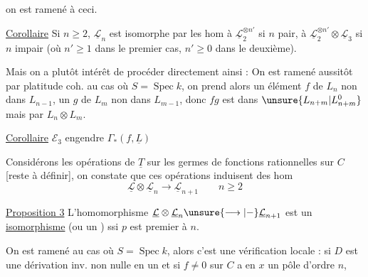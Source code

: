 
on est ramené à ceci.

\uline{Corollaire} Si $n\geq2$, $\underline{\mathcal L}_n$ est isomorphe par les hom  à $\underline{\mathcal L}_2^{\otimes n'}$ si $n$ pair, à $\underline{\mathcal L}_2^{\otimes n'}\otimes\underline{\mathcal L}_3$ si $n$ impair (où $n'\geq1$ dans le premier cas, $n'\geq0$ dans le deuxième).

Mais on a plutôt intérêt de procéder directement ainsi : On est ramené aussitôt par platitude coh. au cas où $S=\operatorname{Spec}k$, on prend alors un élément $f$ de $L_n$ non dans $L_{n-1}$, un $g$ de $L_m$ non dans $L_{m-1}$, donc $fg$ est dans $\unsure{L_{n+m}|L_{n+m}^{0}}$ mais  par  $L_n\otimes L_m$.

\uline{Corollaire} $\mathcal E_3$ engendre $\Gamma_*(f,\underline L)$

Considérons les opérations de $\underline T$ sur les germes de fonctions rationnelles sur $C$ [reste à définir], on constate que  ces opérations induisent des hom
\[
\underline{\mathcal L}\otimes\underline{\mathcal L}_n\longrightarrow\underline{\mathcal L}_{n+1}\qquad n\geq2
\]

\uline{Proposition 3}  L'homomorphisme $\underline{\mathcal L}\otimes\underline{\mathcal L}_n\unsure{\longrightarrow|-}\underline{\mathcal L}_{n+1}$ est un \uline{isomorphisme} (ou  un ) ssi $p$ est premier à $n$.

On est ramené au cas où $S=\operatorname{Spec}k$, alors c'est une vérification locale : si $D$ est une  dérivation inv. non nulle en un  et si $f\neq0$ sur $C$ a en $x$ un pôle d'ordre $n$,

